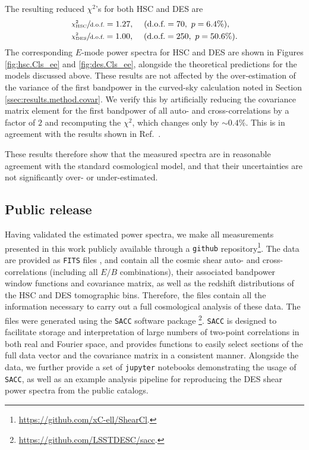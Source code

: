 \documentclass[a4paper,11pt]{article}
\newcommand{\dof}{\text{d.o.f.}}
\begin{document}
      The resulting reduced $\chi^{2}$'s for both HSC and DES are
      \begin{align}
        &\sfrac{\chi^2_{\rm HSC}}{\dof}=1.27,\hspace{12pt}(\dof=70,\,\,p=6.4\%),\\
        &\sfrac{\chi^2_{\rm DES}}{\dof}=1.00,\hspace{12pt}(\dof=250,\,\,p=50.6\%).
      \end{align}
      The corresponding $E$-mode power spectra for HSC and DES are shown in Figures \ref{fig:hsc.Cls_ee} and \ref{fig:des.Cls_ee}, alongside the theoretical predictions for the models discussed above. These results are not affected by the over-estimation of the variance of the first bandpower in the curved-sky calculation noted in Section \ref{ssec:results.method.covar}. We verify this by artificially reducing the covariance matrix element for the first bandpower of all auto- and cross-correlations by a factor of $2$ and recomputing the $\chi^2$, which changes only by $\sim0.4\%$. This is in agreement with the results shown in Ref.~\cite{1906.11765}.

      These results therefore show that the measured spectra are in reasonable agreement with the standard cosmological model, and that their uncertainties are not significantly over- or under-estimated. 

   \subsection{Public release}\label{ssec:results.release}
     Having validated the estimated power spectra, we make all measurements presented in this work publicly available through a {\tt github} repository\footnote{ \url{https://github.com/xC-ell/ShearCl}.}. The data are provided as {\tt FITS} files \cite{1981A&AS...44..363W}, and contain all the cosmic shear auto- and cross-correlations (including all $E/B$ combinations), their associated bandpower window functions and covariance matrix, as well as the redshift distributions of the HSC and DES tomographic bins. Therefore, the files contain all the information necessary to carry out a full cosmological analysis of these data. The files were generated using the {\tt SACC} software package \cite{sacc}\footnote{\url{https://github.com/LSSTDESC/sacc}.}. {\tt SACC} is designed to facilitate storage and interpretation of large numbers of two-point correlations in both real and Fourier space, and provides functions to easily select sections of the full data vector and the covariance matrix in a consistent manner. Alongside the data, we further provide a set of {\tt jupyter} notebooks demonstrating the usage of {\tt SACC}, as well as an example analysis pipeline for reproducing the DES shear power spectra from the public catalogs.
        
\end{document}
